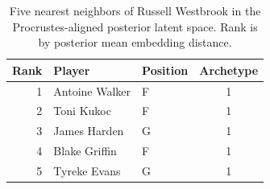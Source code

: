 \begin{table}[htbp]
  \centering\small
  \begin{tabular}{rllc}
    \toprule
    Rank & Player & Position & Archetype \\
    \midrule
    1 & Antoine Walker & F & 1 \\
    2 & Toni Kukoc & F & 1 \\
    3 & James Harden & G & 1 \\
    4 & Blake Griffin & F & 1 \\
    5 & Tyreke Evans & G & 1 \\
    \bottomrule
  \end{tabular}
  \caption{Five nearest neighbors of Russell Westbrook in the Procrustes-aligned posterior latent space. Rank is by posterior mean embedding distance.}
  \label{tab:Russell_Westbrook_neighbors}
\end{table}

